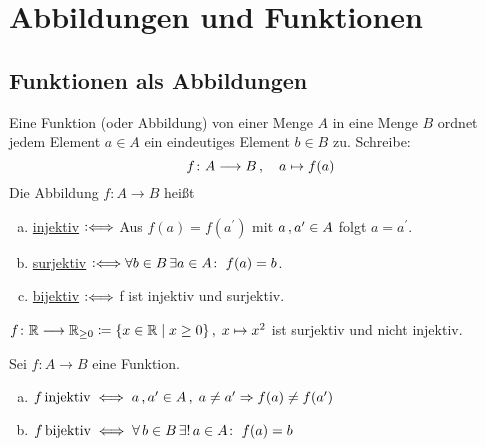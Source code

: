 \documentclass[../ana1.tex]{subfiles}
\begin{document}
\setcounter{section}{3}

\section{Abbildungen und Funktionen}

\subsection{Funktionen als Abbildungen}

\begin{defi}
	Eine Funktion (oder Abbildung) von einer Menge \(A \) in eine Menge \(B \) ordnet jedem Element \(a \in A \)
	ein eindeutiges Element \(b \in B \) zu. Schreibe:
	\[f \colon A \longrightarrow B \operatorname{,} \quad a \mapsto f(a) \]
	Die Abbildung \(f \colon A \longrightarrow B \) heißt
	\begin{enumerate}[(a)]
		\item \underline{injektiv} \(\mathrel{\vcentcolon\Longleftrightarrow} \) Aus \(f(a) = f(a^\prime) \) mit \(a \operatorname{,} a^\prime \in A \) folgt \(a = a^\prime \).
		\item \underline{surjektiv} \(\mathrel{\vcentcolon\Longleftrightarrow} \forall b \in B \, \exists a \in A \colon \; f(a) = b \).
		\item \underline{bijektiv} \(\mathrel{\vcentcolon\Longleftrightarrow} \) f ist injektiv und surjektiv. 
	\end{enumerate}
\end{defi}

\begin{bsp}
	\(f \colon \mathbb{R} \longrightarrow \mathbb{R}_{\geq 0} \coloneqq \{x \in \mathbb{R} \; \vert \; x \geq 0\} \operatorname{,} \; x \mapsto x^{2} \) ist surjektiv und nicht injektiv.
\end{bsp}

\begin{bem}
	Sei \(f \colon A \longrightarrow B \) eine Funktion.
	\begin{enumerate}[(a)]
		\item \(f \operatorname{injektiv} \iff a \operatorname{,} a^\prime \in A \operatorname{,} \; a \neq a^\prime \Rightarrow f(a) \neq f(a^\prime) \)
		\item \(f \operatorname{bijektiv} \iff \forall \, b \in B \, \exists! \,a \in A \colon \; f(a) = b \)
	\end{enumerate}
\end{bem}
\end{document}
